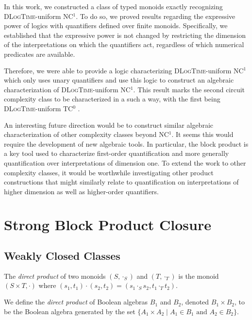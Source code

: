 \documentclass[a4paper,UKenglish,cleveref, autoref, thm-restate, anonymous]{lipics-v2021}
\begin{document}
In this work, we constructed a class of typed monoids exactly recognizing \textsc{DLogTime}-uniform NC${}^1$. To do so, we proved results regarding the expressive power of logics with quantifiers defined over finite monoids.  Specifically, we established that the expressive power is not changed by restricting the dimension of the interpretations on which the quantifiers act, regardless of which numerical predicates are available.

Therefore, we were able to provide a logic characterizing \textsc{DLogTime}-uniform NC${}^1$ which only uses unary quantifiers and use this logic to construct an algebraic characterization of \textsc{DLogTime}-uniform NC${}^1$.  This result marks the second circuit complexity class to be characterized in a such a way, with the first being \textsc{DLogTime}-uniform TC${}^0$ \cite{krebs2007characterizing}.

An interesting future direction would be to  construct similar algebraic characterization of other complexity classes beyond NC${}^1$.  It seems this would require the development of new algebraic tools.  In particular, the block product is a key tool used to characterize first-order quantification and more generally quantification over interpretations of dimension one.  To extend the work to other complexity classes, it would be worthwhile investigating other product constructions that might similarly relate to quantification on interpretations of higher dimension as well as higher-order quantifiers.






\appendix

\section{Strong Block Product Closure}\label{app:bp}

\subsection{Weakly Closed Classes}

\begin{definition}
    The \emph{direct product} of two monoids $(S, \cdot_S)$ and $(T, \cdot_T)$ is the monoid $(S \times T, \cdot)$ where $(s_1, t_1) \cdot (s_2, t_2) = (s_1 \cdot_S s_2, t_1 \cdot_T t_2)$.
\end{definition}
\begin{definition}
    We define the \emph{direct product} of Boolean algebras $B_1$ and $B_2$, denoted $B_1 \times B_2$, to be the Boolean algebra generated by the set $\{A_1 \times A_2 \mid A_1 \in B_1 \text{ and } A_2 \in B_2\}$.
\end{definition}
\end{document}
